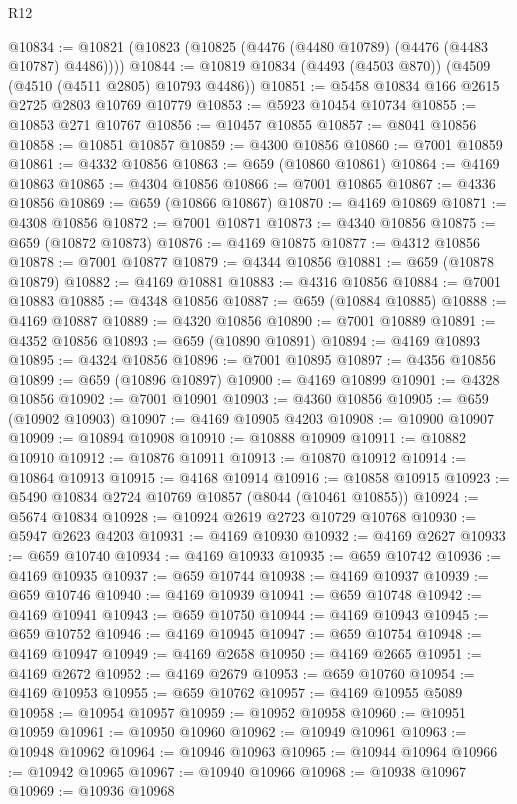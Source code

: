 \begin{lexlean}{R12}
\begin{coremodule}
@10834 := @10821 (@10823 (@10825 (@4476 (@4480 @10789) (@4476 (@4483 @10787) @4486))))
@10844 := @10819 @10834 (@4493 (@4503 @870)) (@4509 (@4510 (@4511 @2805) @10793 @4486))
@10851 := @5458 @10834 @166 @2615 @2725 @2803 @10769 @10779
@10853 := @5923 @10454 @10734
@10855 := @10853 @271 @10767
@10856 := @10457 @10855
@10857 := @8041 @10856
@10858 := @10851 @10857
@10859 := @4300 @10856
@10860 := @7001 @10859
@10861 := @4332 @10856
@10863 := @659 (@10860 @10861)
@10864 := @4169 @10863
@10865 := @4304 @10856
@10866 := @7001 @10865
@10867 := @4336 @10856
@10869 := @659 (@10866 @10867)
@10870 := @4169 @10869
@10871 := @4308 @10856
@10872 := @7001 @10871
@10873 := @4340 @10856
@10875 := @659 (@10872 @10873)
@10876 := @4169 @10875
@10877 := @4312 @10856
@10878 := @7001 @10877
@10879 := @4344 @10856
@10881 := @659 (@10878 @10879)
@10882 := @4169 @10881
@10883 := @4316 @10856
@10884 := @7001 @10883
@10885 := @4348 @10856
@10887 := @659 (@10884 @10885)
@10888 := @4169 @10887
@10889 := @4320 @10856
@10890 := @7001 @10889
@10891 := @4352 @10856
@10893 := @659 (@10890 @10891)
@10894 := @4169 @10893
@10895 := @4324 @10856
@10896 := @7001 @10895
@10897 := @4356 @10856
@10899 := @659 (@10896 @10897)
@10900 := @4169 @10899
@10901 := @4328 @10856
@10902 := @7001 @10901
@10903 := @4360 @10856
@10905 := @659 (@10902 @10903)
@10907 := @4169 @10905 @4203
@10908 := @10900 @10907
@10909 := @10894 @10908
@10910 := @10888 @10909
@10911 := @10882 @10910
@10912 := @10876 @10911
@10913 := @10870 @10912
@10914 := @10864 @10913
@10915 := @4168 @10914
@10916 := @10858 @10915
@10923 := @5490 @10834 @2724 @10769 @10857 (@8044 (@10461 @10855))
@10924 := @5674 @10834
@10928 := @10924 @2619 @2723 @10729 @10768
@10930 := @5947 @2623 @4203
@10931 := @4169 @10930
@10932 := @4169 @2627
@10933 := @659 @10740
@10934 := @4169 @10933
@10935 := @659 @10742
@10936 := @4169 @10935
@10937 := @659 @10744
@10938 := @4169 @10937
@10939 := @659 @10746
@10940 := @4169 @10939
@10941 := @659 @10748
@10942 := @4169 @10941
@10943 := @659 @10750
@10944 := @4169 @10943
@10945 := @659 @10752
@10946 := @4169 @10945
@10947 := @659 @10754
@10948 := @4169 @10947
@10949 := @4169 @2658
@10950 := @4169 @2665
@10951 := @4169 @2672
@10952 := @4169 @2679
@10953 := @659 @10760
@10954 := @4169 @10953
@10955 := @659 @10762
@10957 := @4169 @10955 @5089
@10958 := @10954 @10957
@10959 := @10952 @10958
@10960 := @10951 @10959
@10961 := @10950 @10960
@10962 := @10949 @10961
@10963 := @10948 @10962
@10964 := @10946 @10963
@10965 := @10944 @10964
@10966 := @10942 @10965
@10967 := @10940 @10966
@10968 := @10938 @10967
@10969 := @10936 @10968

\end{coremodule}
\end{lexlean}
